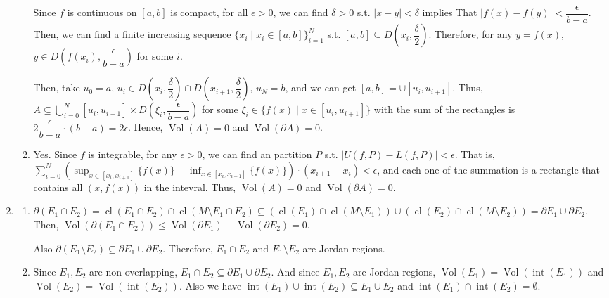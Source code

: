 \documentclass[12pt]{article}
\DeclareMathOperator{\volume}{Vol}
\DeclareMathOperator{\interior}{int}
\DeclareMathOperator{\closure}{cl}
\newcommand{\boundary}{\partial}
\begin{document}
\begin{enumerate}
\begin{enumerate}
        Since $f$ is continuous on $[a, b]$ is compact, for all $\epsilon > 0$, we can find $\delta > 0$ s.t. $|x-y| < \delta$ implies That $|f(x) - f(y)| < \dfrac{\epsilon}{b-a}$.
        Then, we can find a finite increasing sequence $\{x_i \mid x_i \in [a, b]\}_{i=1}^N$ s.t. $[a, b] \subseteq D(x_i, \dfrac{\delta}{2})$.
        Therefore, for any $y = f(x)$, $y \in D(f(x_i), \dfrac{\epsilon}{b-a})$ for some $i$.

        Then, take $u_0 = a$, $u_i \in D(x_i, \dfrac{\delta}{2})\cap D(x_{i+1}, \dfrac{\delta}{2})$, $u_N = b$,
        and we can get $[a, b] = \cup [u_i, u_{i+1}]$.
        Thus, $A \subseteq \displaystyle\bigcup_{i=0}^N [u_i, u_{i+1}] \times D(\xi_i, \dfrac{\epsilon}{b-a})$ for some $\xi_i \in \{ f(x)\mid x\in [u_i, u_{i+1}]\}$
        with the sum of the rectangles is $2\dfrac{\epsilon}{b-a} \cdot (b-a) = 2\epsilon$.
        Hence, $\volume(A) = 0$ and $\volume(\boundary A) = 0$.

        \item Yes. Since $f$ is integrable, for any $\epsilon > 0$, 
        we can find an partition $P$ s.t. $|U(f, P) - L(f, P)|< \epsilon$.
        That is, $\displaystyle\sum_{i=0}^{N} (\displaystyle\sup_{x\in [x_i, x_{i+1}]}\{f(x)\} - \displaystyle\inf_{x\in [x_i, x_{i+1}]}\{f(x)\}) \cdot (x_{i+1} - x_i) < \epsilon$,
        and each one of the summation is a rectangle that contains all $(x, f(x))$ in the intevral.
        Thus, $\volume(A) = 0$ and $\volume(\boundary A) = 0$.
    \end{enumerate}

    \item \begin{enumerate}
        \item $\boundary (E_1 \cap E_2) = \closure(E_1 \cap E_2) \cap \closure(M\setminus E_1 \cap E_2) \subseteq (\closure(E_1) \cap \closure(M \setminus E_1)) \cup (\closure(E_2) \cap \closure(M\setminus E_2)) = \boundary E_1 \cup \boundary E_2$.
        Then, $\volume(\boundary (E_1 \cap E_2)) \leq \volume(\boundary E_1) + \volume(\boundary E_2) = 0$.
        
        Also $\boundary (E_1 \setminus E_2) \subseteq \boundary E_1 \cup \boundary E_2$.
        Therefore, $E_1 \cap E_2$ and $E_1 \setminus E_2$ are Jordan regions.
    
        \item Since $E_1, E_2$ are non-overlapping, $E_1 \cap E_2 \subseteq \boundary E_1 \cup \boundary E_2$.
        And since $E_1, E_2$ are Jordan regions, $\volume(E_1) = \volume(\interior(E_1))$ and $\volume(E_2) = \volume(\interior(E_2))$.
        Also we have $\interior(E_1) \cup \interior(E_2) \subseteq E_1 \cup E_2$ and $\interior(E_1) \cap \interior(E_2) = \emptyset$.


\end{enumerate}
\end{enumerate}
\end{document}

